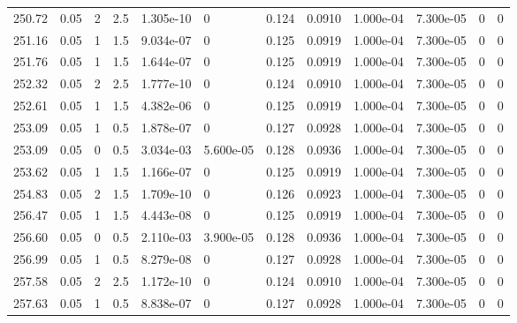 \documentclass[preview]{standalone}
\begin{document}
{{{{{{{{\begin{tabular}{L{1.2cm}C{1.2cm} C{0.3cm}C{0.5cm} C{1.4cm}C{1.4cm} C{1.4cm}C{1.4cm} C{1.6cm}C{1.6cm} C{1.6cm}C{1.6cm}}
  250.72  &  0.05  & 2     & 2.5 &  1.305e-10  & 0  &  0.124&   0.0910& 1.000e-04 & 7.300e-05   &  0 & 0  \\ 
  251.16  &  0.05  & 1     & 1.5 &  9.034e-07  & 0  &  0.125&   0.0919& 1.000e-04 & 7.300e-05   &  0 & 0  \\ 
  251.76  &  0.05  & 1     & 1.5 &  1.644e-07  & 0  &  0.125&   0.0919& 1.000e-04 & 7.300e-05   &  0 & 0  \\ 
  252.32  &  0.05  & 2     & 2.5 &  1.777e-10  & 0  &  0.124&   0.0910& 1.000e-04 & 7.300e-05   &  0 & 0  \\ 
  252.61  &  0.05  & 1     & 1.5 &  4.382e-06  & 0  &  0.125&   0.0919& 1.000e-04 & 7.300e-05   &  0 & 0  \\ 
  253.09  &  0.05  & 1     & 0.5 &  1.878e-07  & 0  &  0.127&   0.0928& 1.000e-04 & 7.300e-05   &  0 & 0  \\ 
  253.09  &  0.05  & 0     & 0.5 &  3.034e-03  & 5.600e-05  &  0.128&   0.0936& 1.000e-04 & 7.300e-05   &  0 & 0  \\ 
  253.62  &  0.05  & 1     & 1.5 &  1.166e-07  & 0  &  0.125&   0.0919& 1.000e-04 & 7.300e-05   &  0 & 0  \\ 
  254.83  &  0.05  & 2     & 1.5 &  1.709e-10  & 0  &  0.126&   0.0923& 1.000e-04 & 7.300e-05   &  0 & 0  \\ 
  256.47  &  0.05  & 1     & 1.5 &  4.443e-08  & 0  &  0.125&   0.0919& 1.000e-04 & 7.300e-05   &  0 & 0  \\ 
  256.60  &  0.05  & 0     & 0.5 &  2.110e-03  & 3.900e-05  &  0.128&   0.0936& 1.000e-04 & 7.300e-05   &  0 & 0  \\ 
  256.99  &  0.05  & 1     & 0.5 &  8.279e-08  & 0  &  0.127&   0.0928& 1.000e-04 & 7.300e-05   &  0 & 0  \\ 
  257.58  &  0.05  & 2     & 2.5 &  1.172e-10  & 0  &  0.124&   0.0910& 1.000e-04 & 7.300e-05   &  0 & 0  \\ 
  257.63  &  0.05  & 1     & 0.5 &  8.838e-07  & 0  &  0.127&   0.0928& 1.000e-04 & 7.300e-05   &  0 & 0  \\ 
\hline 
\end{tabular} 

}}}}}}}}
\end{document}
